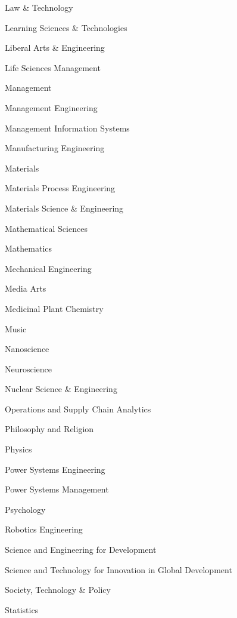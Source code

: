 \begin{CompactItemize}[leftmargin = *]
\begin{CompactItemize}
\begin{CompactItemize}
\begin{CompactItemize}
                \item Law \& Technology
                \item Learning Sciences \& Technologies
                \item Liberal Arts \& Engineering
                \item Life Sciences Management
                \item Management
                \item Management Engineering
                \item Management Information Systems
                \item Manufacturing Engineering
                \item Materials
                \item Materials Process Engineering
                \item Materials Science \& Engineering
                \item Mathematical Sciences
                \item Mathematics
                \item Mechanical Engineering
                \item Media Arts
                \item Medicinal Plant Chemistry
                \item Music
                \item Nanoscience
                \item Neuroscience
                \item Nuclear Science \& Engineering
                \item Operations and Supply Chain Analytics
                \item Philosophy and Religion
                \item Physics
                \item Power Systems Engineering
                \item Power Systems Management
                \item Psychology
                \item Robotics Engineering
                \item Science and Engineering for Development
                \item Science and Technology for Innovation in Global Development
                \item Society, Technology \& Policy
                \item Statistics

\end{CompactItemize}
\end{CompactItemize}
\end{CompactItemize}
\end{CompactItemize}

